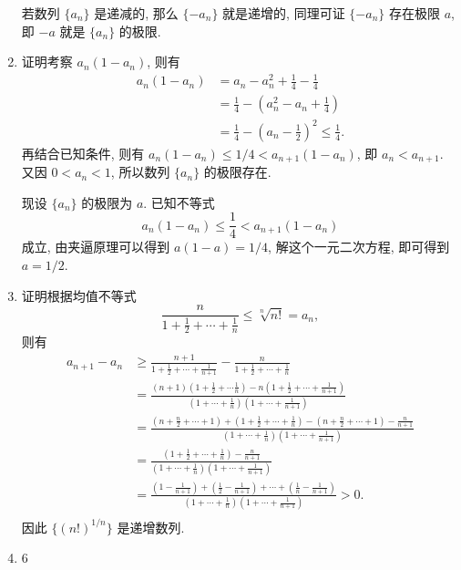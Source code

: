 \begin{enumerate}
        若数列 $\{a_n\}$ 是递减的, 那么 $\{-a_n\}$ 就是递增的, 同理可证 $\{-a_n\}$ 存在极限 $a$,
        即 $-a$ 就是 $\{a_n\}$ 的极限.
    \item {\heiti 证明}\quad 考察 $a_n(1 - a_n)$, 则有
        \begin{align*}
            a_n(1 - a_n) &= a_n - a_n^2 + \frac14 - \frac14 \\
                         &= \frac14 - \left(a_n^2 - a_n + \frac14\right) \\
                         &= \frac14 - \left(a_n - \frac12\right)^2 \leqslant \frac14. 
        \end{align*}
        再结合已知条件, 则有 $a_n(1 - a_n) \leqslant 1/4 < a_{n+1}(1 - a_n)$, 即 $a_n < a_{n+1}$.
        又因 $0 < a_n < 1$, 所以数列 $\{a_n\}$ 的极限存在.

        现设 $\{a_n\}$ 的极限为 $a$. 已知不等式
        \[
            a_n(1 - a_n) \leqslant \frac14 < a_{n+1}(1 - a_n)    
        \]
        成立, 由夹逼原理可以得到 $a(1 - a) = 1/4$, 解这个一元二次方程, 即可得到 $a = 1/2$.

    \item {\heiti 证明}\quad 根据均值不等式
        \[
            \frac{n}{1 + \frac12 + \cdots + \frac1n} \leqslant \sqrt[n]{n!} = a_n,    
        \]
        则有
        \begin{align*}
            a_{n+1} - a_n &\geqslant \frac{n+1}{1 + \frac12 + \cdots + \frac{1}{n+1}} - \frac{n}{1 + \frac12 + \cdots + \frac1n} \\
                          &= \frac{(n+1)\left(1 + \frac12 + \cdots \frac1n\right) - n\left(1 + \frac12 + \cdots + \frac{1}{n+1}\right)}{\left(1 + \cdots + \frac1n\right)\left(1 + \cdots + \frac{1}{n+1}\right)} \\
                          &= \frac{\left(n + \frac n2 + \cdots + 1\right) + \left(1 + \frac12 + \cdots + \frac1n\right) - \left(n + \frac n2 + \cdots + 1\right) - \frac{n}{n+1}}{\left(1 + \cdots + \frac1n\right)\left(1 + \cdots + \frac{1}{n+1}\right)} \\
                          &= \frac{\left(1 + \frac12 + \cdots + \frac1n\right) - \frac{n}{n+1}}{\left(1 + \cdots + \frac1n\right)\left(1 + \cdots + \frac{1}{n+1}\right)} \\
                          &= \frac{\left(1 - \frac{1}{n+1}\right) + \left(\frac12 - \frac{1}{n+1}\right) + \cdots + \left(\frac1n - \frac{1}{n+1}\right)}{\left(1 + \cdots + \frac1n\right)\left(1 + \cdots + \frac{1}{n+1}\right)} > 0. \\
        \end{align*}
        因此 $\{(n!)^{1/n}\}$ 是递增数列.
    \item 6
\end{enumerate}
% 
